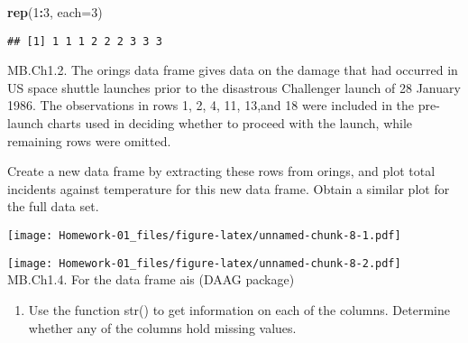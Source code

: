 \documentclass[
]{article}
\newenvironment{Shaded}{\begin{snugshade}}{\end{snugshade}}
\newcommand{\DataTypeTok}[1]{\textcolor[rgb]{0.13,0.29,0.53}{#1}}
\newcommand{\DecValTok}[1]{\textcolor[rgb]{0.00,0.00,0.81}{#1}}
\newcommand{\KeywordTok}[1]{\textcolor[rgb]{0.13,0.29,0.53}{\textbf{#1}}}
\newcommand{\NormalTok}[1]{#1}
\newcommand{\OperatorTok}[1]{\textcolor[rgb]{0.81,0.36,0.00}{\textbf{#1}}}
\providecommand{\tightlist}{%
  \setlength{\itemsep}{0pt}\setlength{\parskip}{0pt}}
\begin{document}
\begin{Shaded}
\begin{Highlighting}[]
\KeywordTok{rep}\NormalTok{(}\DecValTok{1}\OperatorTok{:}\DecValTok{3}\NormalTok{, }\DataTypeTok{each=}\DecValTok{3}\NormalTok{)}
\end{Highlighting}
\end{Shaded}

\begin{verbatim}
## [1] 1 1 1 2 2 2 3 3 3
\end{verbatim}

MB.Ch1.2. The orings data frame gives data on the damage that had
occurred in US space shuttle launches prior to the disastrous Challenger
launch of 28 January 1986. The observations in rows 1, 2, 4, 11, 13,and
18 were included in the pre-launch charts used in deciding whether to
proceed with the launch, while remaining rows were omitted.

Create a new data frame by extracting these rows from orings, and plot
total incidents against temperature for this new data frame. Obtain a
similar plot for the full data set.

\begin{Shaded}
\end{Shaded}

\texttt{[image: Homework-01\_files/figure-latex/unnamed-chunk-8-1.pdf]}

\begin{Shaded}
\end{Shaded}

\texttt{[image: Homework-01\_files/figure-latex/unnamed-chunk-8-2.pdf]}
MB.Ch1.4. For the data frame ais (DAAG package)

\begin{enumerate}
\def\labelenumi{(\alph{enumi})}
\tightlist
\item
  Use the function str() to get information on each of the columns.
  Determine whether any of the columns hold missing values.
\end{enumerate}
\end{document}
